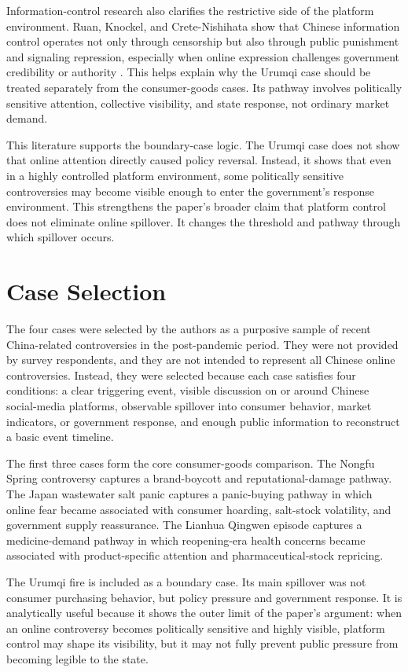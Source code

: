 \documentclass[conference]{IEEEtran}
\begin{document}
Information-control research also clarifies the restrictive side of the platform environment. Ruan, Knockel, and Crete-Nishihata show that Chinese information control operates not only through censorship but also through public punishment and signaling repression, especially when online expression challenges government credibility or authority \cite{ruan2021punishment}. This helps explain why the Urumqi case should be treated separately from the consumer-goods cases. Its pathway involves politically sensitive attention, collective visibility, and state response, not ordinary market demand.

This literature supports the boundary-case logic. The Urumqi case does not show that online attention directly caused policy reversal. Instead, it shows that even in a highly controlled platform environment, some politically sensitive controversies may become visible enough to enter the government's response environment. This strengthens the paper's broader claim that platform control does not eliminate online spillover. It changes the threshold and pathway through which spillover occurs.

\section{Case Selection}
The four cases were selected by the authors as a purposive sample of recent China-related controversies in the post-pandemic period. They were not provided by survey respondents, and they are not intended to represent all Chinese online controversies. Instead, they were selected because each case satisfies four conditions: a clear triggering event, visible discussion on or around Chinese social-media platforms, observable spillover into consumer behavior, market indicators, or government response, and enough public information to reconstruct a basic event timeline.

The first three cases form the core consumer-goods comparison. The Nongfu Spring controversy captures a brand-boycott and reputational-damage pathway. The Japan wastewater salt panic captures a panic-buying pathway in which online fear became associated with consumer hoarding, salt-stock volatility, and government supply reassurance. The Lianhua Qingwen episode captures a medicine-demand pathway in which reopening-era health concerns became associated with product-specific attention and pharmaceutical-stock repricing.

The Urumqi fire is included as a boundary case. Its main spillover was not consumer purchasing behavior, but policy pressure and government response. It is analytically useful because it shows the outer limit of the paper's argument: when an online controversy becomes politically sensitive and highly visible, platform control may shape its visibility, but it may not fully prevent public pressure from becoming legible to the state.
\end{document}
